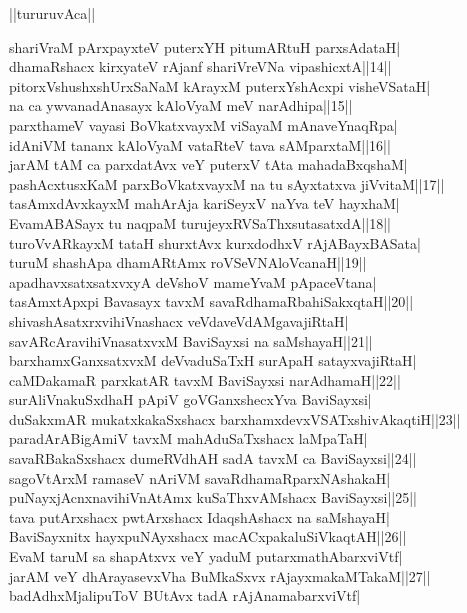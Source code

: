 \documentclass{article}
\begin{document}
\begin{center}
||tururuvAca||
\end{center}

shariVraM pArxpayxteV puterxYH pitumARtuH parxsAdataH|\\
dhamaRshacx kirxyateV rAjanf shariVreVNa vipashicxtA||14||\\
pitorxVshushxshUrxSaNaM kArayxM puterxYshAcxpi visheVSataH|\\
na ca ywvanadAnasayx kAloVyaM meV narAdhipa||15||\\
parxthameV vayasi BoVkatxvayxM viSayaM mAnaveYnaqRpa|\\
idAniVM tananx kAloVyaM vataRteV tava sAMparxtaM||16||\\
jarAM tAM ca parxdatAvx veY puterxV tAta mahadaBxqshaM|\\
pashAcxtusxKaM parxBoVkatxvayxM na tu sAyxtatxva jiVvitaM||17||\\
tasAmxdAvxkayxM mahArAja kariSeyxV naYva teV hayxhaM|\\
EvamABASayx tu naqpaM turujeyxRVSaThxsutasatxdA||18||\\
turoVvARkayxM tataH shurxtAvx kurxdodhxV rAjABayxBASata|\\
turuM shashApa dhamARtAmx roVSeVNAloVcanaH||19||\\
apadhavxsatxsatxvxyA deVshoV mameYvaM pApaceVtana|\\
tasAmxtApxpi Bavasayx tavxM savaRdhamaRbahiSakxqtaH||20||\\
shivashAsatxrxvihiVnashacx veVdaveVdAMgavajiRtaH|\\
savARcAravihiVnasatxvxM BaviSayxsi na saMshayaH||21||\\
barxhamxGanxsatxvxM deVvaduSaTxH surApaH satayxvajiRtaH|\\
caMDakamaR parxkatAR tavxM BaviSayxsi narAdhamaH||22||\\
surAliVnakuSxdhaH pApiV goVGanxshecxYva BaviSayxsi|\\
duSakxmAR mukatxkakaSxshacx barxhamxdevxVSATxshivAkaqtiH||23||\\
paradArABigAmiV tavxM mahAduSaTxshacx laMpaTaH|\\
savaRBakaSxshacx dumeRVdhAH sadA tavxM ca BaviSayxsi||24||\\
sagoVtArxM ramaseV nAriVM savaRdhamaRparxNAshakaH|\\
puNayxjAcnxnavihiVnAtAmx kuSaThxvAMshacx BaviSayxsi||25||\\
tava putArxshacx pwtArxshacx IdaqshAshacx na saMshayaH|\\
BaviSayxnitx hayxpuNAyxshacx macACxpakaluSiVkaqtAH||26||\\
EvaM taruM sa shapAtxvx veY yaduM putarxmathAbarxviVtf|\\
jarAM veY dhArayasevxVha BuMkaSxvx rAjayxmakaMTakaM||27||\\
badAdhxMjalipuToV BUtAvx tadA rAjAnamabarxviVtf|
\end{document}
